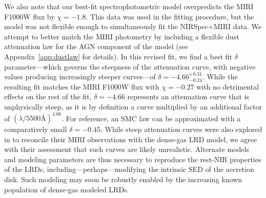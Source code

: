 \documentclass[twocolumn]{aastex7}
\begin{document}
We also note that our best-fit spectrophotometric model overpredicts the MIRI F1000W flux by $\chi = -1.8$. 
This data was used in the fitting procedure, but the model was not flexible enough to simultaneously fit the NIRSpec+MIRI data. We attempt to better match the MIRI photometry by including a flexible dust attenuation law for the AGN component of the model (see Appendix~\ref{app:dustlaw} for details). In this revised fit, we find a best fit \cite{salim18} $\delta$ parameter---which governs the steepness of the attenuation curve, with negative values producing increasingly steeper curves---of $\delta=-4.66^{+0.31}_{-0.24}$.  While the resulting fit matches the MIRI F1000W flux with $\chi=-0.27$ with no detrimental effects on the rest of the fit, $\delta=-4.66$ represents an attenuation curve that is unphysically steep, as it is by definition a \citep{calzetti01} curve multiplied by an additional factor of $(\lambda/5500\textrm{\AA})^{4.66}$. For reference, an SMC law can be approximated with a comparatively small $\delta=-0.45$. While steep attenuation curves were also explored in \cite{degraaff25} to reconcile their MIRI observations with the dense-gas LRD model, we agree with their assessment that such curves are likely unrealistic. Alternate models and modeling parameters are thus necessary to reproduce the rest-NIR properties of the LRDs, including---perhaps---modifying the intrinsic SED of the accretion disk. Such modeling may soon be robustly enabled by the increasing known population of dense-gas modeled LRDs.
\end{document}
